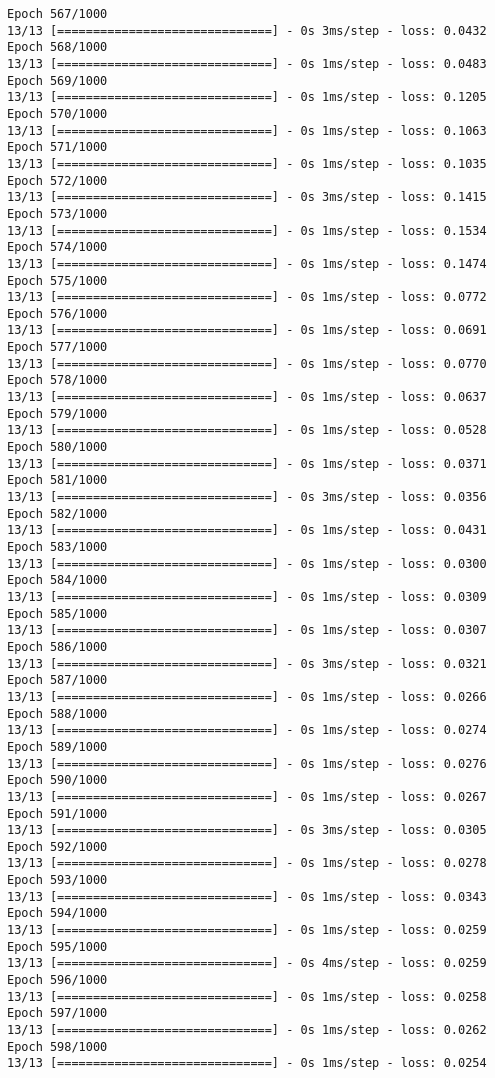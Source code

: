 \documentclass[11pt]{article}
\begin{document}
\begin{Verbatim}[commandchars=\\\{\}]
Epoch 567/1000
13/13 [==============================] - 0s 3ms/step - loss: 0.0432
Epoch 568/1000
13/13 [==============================] - 0s 1ms/step - loss: 0.0483
Epoch 569/1000
13/13 [==============================] - 0s 1ms/step - loss: 0.1205
Epoch 570/1000
13/13 [==============================] - 0s 1ms/step - loss: 0.1063
Epoch 571/1000
13/13 [==============================] - 0s 1ms/step - loss: 0.1035
Epoch 572/1000
13/13 [==============================] - 0s 3ms/step - loss: 0.1415
Epoch 573/1000
13/13 [==============================] - 0s 1ms/step - loss: 0.1534
Epoch 574/1000
13/13 [==============================] - 0s 1ms/step - loss: 0.1474
Epoch 575/1000
13/13 [==============================] - 0s 1ms/step - loss: 0.0772
Epoch 576/1000
13/13 [==============================] - 0s 1ms/step - loss: 0.0691
Epoch 577/1000
13/13 [==============================] - 0s 1ms/step - loss: 0.0770
Epoch 578/1000
13/13 [==============================] - 0s 1ms/step - loss: 0.0637
Epoch 579/1000
13/13 [==============================] - 0s 1ms/step - loss: 0.0528
Epoch 580/1000
13/13 [==============================] - 0s 1ms/step - loss: 0.0371
Epoch 581/1000
13/13 [==============================] - 0s 3ms/step - loss: 0.0356
Epoch 582/1000
13/13 [==============================] - 0s 1ms/step - loss: 0.0431
Epoch 583/1000
13/13 [==============================] - 0s 1ms/step - loss: 0.0300
Epoch 584/1000
13/13 [==============================] - 0s 1ms/step - loss: 0.0309
Epoch 585/1000
13/13 [==============================] - 0s 1ms/step - loss: 0.0307
Epoch 586/1000
13/13 [==============================] - 0s 3ms/step - loss: 0.0321
Epoch 587/1000
13/13 [==============================] - 0s 1ms/step - loss: 0.0266
Epoch 588/1000
13/13 [==============================] - 0s 1ms/step - loss: 0.0274
Epoch 589/1000
13/13 [==============================] - 0s 1ms/step - loss: 0.0276
Epoch 590/1000
13/13 [==============================] - 0s 1ms/step - loss: 0.0267
Epoch 591/1000
13/13 [==============================] - 0s 3ms/step - loss: 0.0305
Epoch 592/1000
13/13 [==============================] - 0s 1ms/step - loss: 0.0278
Epoch 593/1000
13/13 [==============================] - 0s 1ms/step - loss: 0.0343
Epoch 594/1000
13/13 [==============================] - 0s 1ms/step - loss: 0.0259
Epoch 595/1000
13/13 [==============================] - 0s 4ms/step - loss: 0.0259
Epoch 596/1000
13/13 [==============================] - 0s 1ms/step - loss: 0.0258
Epoch 597/1000
13/13 [==============================] - 0s 1ms/step - loss: 0.0262
Epoch 598/1000
13/13 [==============================] - 0s 1ms/step - loss: 0.0254

\end{Verbatim}
\end{document}
